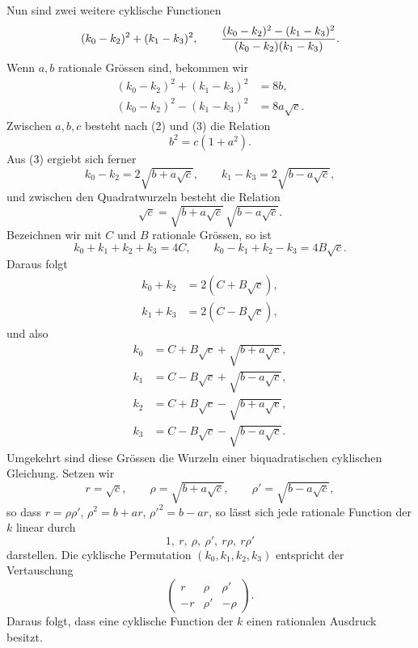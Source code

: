 \documentclass[11pt]{article}
\begin{document}
Nun sind zwei weitere cyklische Functionen
\[
  (k_0-k_2)^2+(k_1-k_3)^2,
  \qquad
  { (k_0-k_2)^2-(k_1-k_3)^2\over (k_0-k_2)(k_1-k_3)}.
\]
Wenn $a,b$ rationale Gr\"ossen sind, bekommen wir
\begin{equation}\tag{3}
\begin{aligned}
  (k_0-k_2)^2+(k_1-k_3)^2 &= 8b,\\
  (k_0-k_2)^2-(k_1-k_3)^2 &= 8a\sqrt c.
\end{aligned}
\end{equation}
Zwischen $a,b,c$ besteht nach (2) und (3) die Relation
\begin{equation}\tag{4}
  b^2=c(1+a^2).
\end{equation}
Aus (3) ergiebt sich ferner
\begin{equation}\tag{5}
  k_0-k_2=2\sqrt{b+a\sqrt c},\qquad
  k_1-k_3=2\sqrt{b-a\sqrt c},
\end{equation}
und zwischen den Quadratwurzeln besteht die Relation
\begin{equation}\tag{6}
  \sqrt c=\sqrt{b+a\sqrt c}\,\sqrt{b-a\sqrt c}.
\end{equation}
Bezeichnen wir mit $C$ und $B$ rationale Gr\"ossen, so ist
\begin{equation}\tag{7}
  k_0+k_1+k_2+k_3=4C,
  \qquad
  k_0-k_1+k_2-k_3=4B\sqrt c.
\end{equation}
Daraus folgt
\begin{equation}\tag{8}
\begin{aligned}
  k_0+k_2&=2(C+B\sqrt c),\\
  k_1+k_3&=2(C-B\sqrt c),
\end{aligned}
\end{equation}
und also
\begin{equation}\tag{9}
\begin{aligned}
 k_0&=C+B\sqrt c+\sqrt{b+a\sqrt c},\\
 k_1&=C-B\sqrt c+\sqrt{b-a\sqrt c},\\
 k_2&=C+B\sqrt c-\sqrt{b+a\sqrt c},\\
 k_3&=C-B\sqrt c-\sqrt{b-a\sqrt c}.
\end{aligned}
\end{equation}
Umgekehrt sind diese Gr\"ossen die Wurzeln einer biquadratischen cyklischen Gleichung. Setzen wir
\begin{equation}\tag{10}
  r=\sqrt c,\qquad \rho=\sqrt{b+a\sqrt c},\qquad \rho'=\sqrt{b-a\sqrt c},
\end{equation}
so dass $r=\rho\rho'$, $\rho^2=b+ar$, $\rho'^2=b-ar$, so l\"asst sich jede rationale Function der $k$ linear durch
\[
  1,\ r,\ \rho,\ \rho',\ r\rho,\ r\rho'
\]
darstellen. Die cyklische Permutation $(k_0,k_1,k_2,k_3)$ entspricht der Vertauschung
\[
  \begin{pmatrix} r&\rho&\rho'\\ -r&\rho'&-\rho\end{pmatrix}.
\]
Daraus folgt, dass eine cyklische Function der $k$ einen rationalen Ausdruck besitzt.
\end{document}
